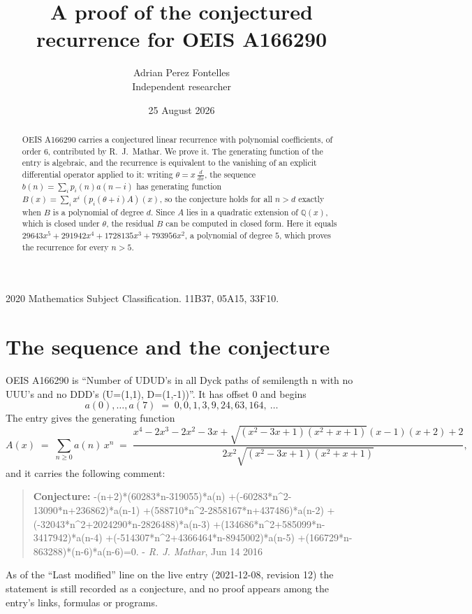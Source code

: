 \documentclass[11pt,a4paper]{article}
\title{A proof of the conjectured recurrence for OEIS A166290}
\author{Adrian Perez Fontelles\\ \small Independent researcher}
\date{25 August 2026}
\theoremstyle{plain}
\theoremstyle{definition}
\begin{document}
\maketitle

\begin{abstract}
OEIS A166290 carries a conjectured linear recurrence with polynomial coefficients, of
order 6, contributed by R.~J.~Mathar. We prove it. The generating function of the
entry is algebraic, and the recurrence is equivalent to the vanishing of an explicit
differential operator applied to it: writing $\theta=x\,\frac{d}{dx}$, the sequence
$b(n)=\sum_{i}p_{i}(n)a(n-i)$ has generating function
$B(x)=\sum_{i}x^{i}\,(p_{i}(\theta+i)A)(x)$, so the conjecture holds for all $n>d$ exactly
when $B$ is a polynomial of degree $d$. Since $A$ lies in a quadratic extension of
$\mathbb{Q}(x)$, which is closed under $\theta$, the residual $B$ can be computed in
closed form. Here it equals $29643 x^{5} + 291942 x^{4} + 1728135 x^{3} + 793956 x^{2}$, a polynomial of degree $5$, which proves
the recurrence for every $n>5$.
\end{abstract}

\noindent\small 2020 Mathematics Subject Classification. 11B37, 05A15, 33F10.\normalsize

\section{The sequence and the conjecture}

OEIS A166290 is ``Number of UDUD's in all Dyck paths of semilength n with no UUU's and no DDD's (U=(1,1), D=(1,-1))''. It has offset $0$ and begins
\[
a(0),\dots,a(7)\;=\;0, 0, 1, 3, 9, 24, 63, 164,\ \dots
\]
The entry gives the generating function
\begin{equation}\label{eq:gf}
A(x)\;=\;\sum_{n\ge 0} a(n)\,x^{n}\;=\;\frac{x^{4} - 2 x^{3} - 2 x^{2} - 3 x + \sqrt{\left(x^{2} - 3 x + 1\right) \left(x^{2} + x + 1\right)} \left(x - 1\right) \left(x + 2\right) + 2}{2 x^{2} \sqrt{\left(x^{2} - 3 x + 1\right) \left(x^{2} + x + 1\right)}} ,
\end{equation}
and it carries the following comment:
\begin{quote}\small
\textbf{Conjecture:} -(n+2)*(60283*n-319055)*a(n) +(-60283*n\^{}2-13090*n+236862)*a(n-1) +(588710*n\^{}2-2858167*n+437486)*a(n-2) +(-32043*n\^{}2+2024290*n-2826488)*a(n-3) +(134686*n\^{}2+585099*n-3417942)*a(n-4) +(-514307*n\^{}2+4366464*n-8945002)*a(n-5) +(166729*n-863288)*(n-6)*a(n-6)=0. - \emph{R. J. Mathar}, Jun 14 2016
\end{quote}
As of the ``Last modified'' line on the live entry (2021-12-08, revision 12) the
statement is still recorded as a conjecture, and no proof appears among the entry's links,
formulas or programs.
\end{document}
